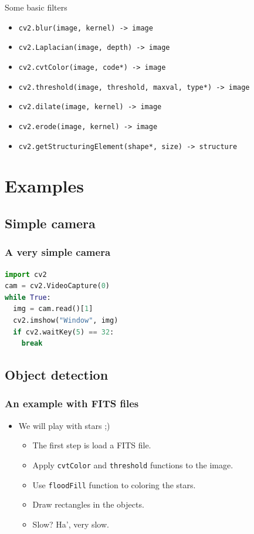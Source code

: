 \documentclass{beamer}
\begin{document}
\begin{frame}{Some basic filters}
\transdissolve
  \pause
  \begin{itemize}[<+-| alert@+ >]
    \item \texttt{cv2.blur(image, kernel) -> image}
    \item \texttt{cv2.Laplacian(image, depth) -> image}
    \item \texttt{cv2.cvtColor(image, code*) -> image}
    \item \texttt{cv2.threshold(image, threshold, maxval, type*) -> image}
    \item \texttt{cv2.dilate(image, kernel) -> image}
    \item \texttt{cv2.erode(image, kernel) -> image}
    \item \texttt{cv2.getStructuringElement(shape*, size) -> structure}
  \end{itemize}
\end{frame}

\section{Examples}
\subsection{Simple camera}
\begin{frame}[fragile]
  \frametitle{A very simple camera}
    \transdissolve
  \pause
\begin{lstlisting}[language = Python]
import cv2
cam = cv2.VideoCapture(0)
while True:
  img = cam.read()[1]
  cv2.imshow("Window", img)
  if cv2.waitKey(5) == 32:
    break
\end{lstlisting}
\end{frame}

\subsection{Object detection}
\begin{frame}[fragile]
  \frametitle{An example with FITS files}
    \transdissolve
    \pause
\begin{itemize}
  \item We will play with stars ;)
  \begin{itemize}
   \item The first step is load a FITS file.
   \item Apply \texttt{cvtColor} and \texttt{threshold} functions to the image.
   \item Use \texttt{floodFill} function to coloring the stars.
   \item Draw rectangles in the objects.
   \item Slow? \pause Ha', very slow.
  \end{itemize}
\end{itemize}
\end{frame}
\end{document}
